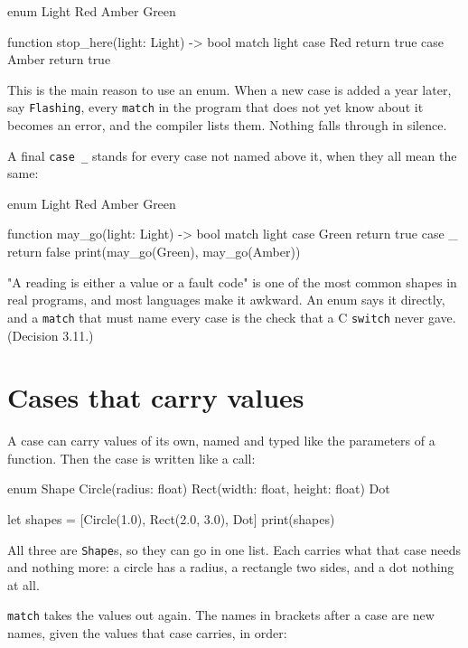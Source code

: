 \begin{zeno}[fails=yes]
enum Light {
    Red
    Amber
    Green
}

function stop_here(light: Light) -> bool {
    match light {
        case Red { return true }
        case Amber { return true }
    }
}
\end{zeno}

This is the main reason to use an enum. When a new case is added a
year later, say \verb|Flashing|, every \verb|match| in the program that
does not yet know about it becomes an error, and the compiler lists
them. Nothing falls through in silence.

A final \verb|case _| stands for every case not named above it, when
they all mean the same:

\begin{zeno}
enum Light {
    Red
    Amber
    Green
}

function may_go(light: Light) -> bool {
    match light {
        case Green { return true }
        case _ { return false }
    }
}
print(may_go(Green), may_go(Amber))
\end{zeno}

\begin{why}
"A reading is either a value or a fault code" is one of the most common
shapes in real programs, and most languages make it awkward. An enum
says it directly, and a \verb|match| that must name every case is the
check that a C \verb|switch| never gave. (Decision 3.11.)
\end{why}

\section{Cases that carry values}

A case can carry values of its own, named and typed like the
parameters of a function. Then the case is written like a call:

\begin{zeno}
enum Shape {
    Circle(radius: float)
    Rect(width: float, height: float)
    Dot
}

let shapes = [Circle(1.0), Rect(2.0, 3.0), Dot]
print(shapes)
\end{zeno}

All three are \verb|Shape|s, so they can go in one list. Each carries
what that case needs and nothing more: a circle has a radius, a
rectangle two sides, and a dot nothing at all.

\verb|match| takes the values out again. The names in brackets after a
case are new names, given the values that case carries, in order:

